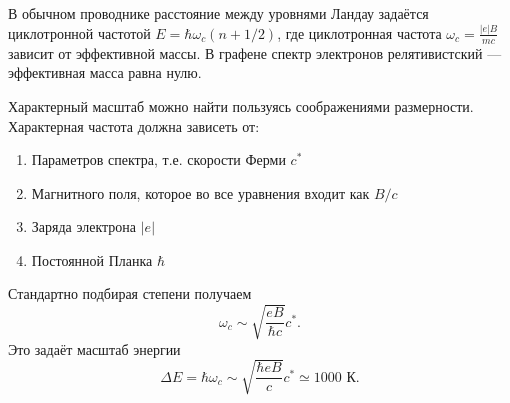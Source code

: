 \documentclass[a4paper]{article}
\begin{document}
\begin{sol}
В обычном проводнике расстояние между уровнями
Ландау задаётся циклотронной частотой $E= \hbar \omega_c (n+1 /2)$, где циклотронная частота $\omega_c = \frac{|e|B}{mc}$ зависит от эффективной
массы. В графене спектр электронов релятивистский
--- эффективная масса равна нулю.

Характерный масштаб можно найти пользуясь соображениями размерности. Характерная
частота должна зависеть от:
\begin{enumerate}
\item Параметров спектра, т.\:е. скорости Ферми
	$c^*$ 
\item Магнитного поля, которое во все уравнения
	входит как $B /c$ 
\item Заряда электрона $|e|$
\item Постоянной Планка $\hbar$
\end{enumerate}
Стандартно подбирая степени получаем
\[
\omega_c \sim  \sqrt{\frac{eB}{\hbar c}} c^*
.\] 
Это задаёт масштаб энергии 
\[
\Delta E= \hbar  \omega_c \sim  \sqrt{\frac{\hbar  e B}{c}} c^*\simeq 1000 \text{ К}
.\] 
\end{sol}
\end{document}
